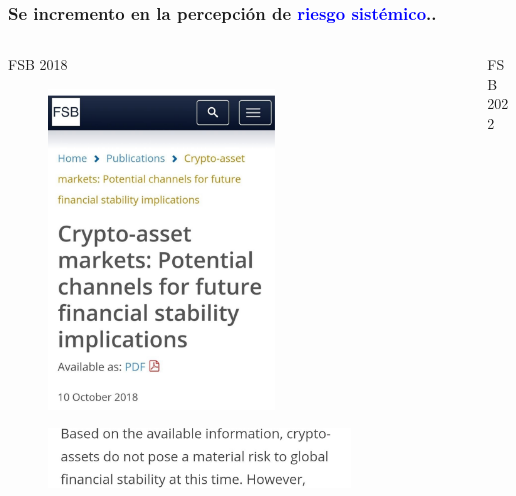 \begin{frame}
\frametitle{Se incremento en la percepción de \textcolor{blue}{riesgo sistémico}..}

\begin{columns}
    \begin{column}{0.5\textwidth}
        \begin{block}{FSB 2018}
        \begin{figure}[H]
        \begin{center}
         \includegraphics[width=0.6\textwidth]{images/C1/FSB 2018a.pdf}
         \end{center}
        \end{figure}
            \begin{figure}[H]
        \begin{center}
         \includegraphics[width=0.8\textwidth]{images/C1/FSB 2018b}
         \end{center}
        \end{figure}
    \end{block}
    \end{column}
    \begin{column}{0.5\textwidth}  %
        \begin{block}{FSB 2022}
        

\end{block}
\end{column}
\end{columns}
\end{frame}
